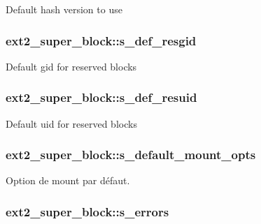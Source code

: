 Default hash version to use \hypertarget{structext2__super__block_a2973f6cda59f008e1f649c6d68ddafd6}{
\subsubsection[{s\-\_\-def\-\_\-resgid}]{ ext2\-\_\-super\-\_\-block\-::s\-\_\-def\-\_\-resgid}}\label{structext2__super__block_a2973f6cda59f008e1f649c6d68ddafd6}
Default gid for reserved blocks \hypertarget{structext2__super__block_a83da108c4a1f27a275f54970fb8edf07}{
\subsubsection[{s\-\_\-def\-\_\-resuid}]{ ext2\-\_\-super\-\_\-block\-::s\-\_\-def\-\_\-resuid}}\label{structext2__super__block_a83da108c4a1f27a275f54970fb8edf07}
Default uid for reserved blocks \hypertarget{structext2__super__block_a8f4946dffa8c6a9027ee9329fd3f94c9}{
\subsubsection[{s\-\_\-default\-\_\-mount\-\_\-opts}]{ ext2\-\_\-super\-\_\-block\-::s\-\_\-default\-\_\-mount\-\_\-opts}}\label{structext2__super__block_a8f4946dffa8c6a9027ee9329fd3f94c9}
Option de mount par défaut. \hypertarget{structext2__super__block_a06e31d621f6250d56d1af5c342220a08}{
\subsubsection[{s\-\_\-errors}]{ ext2\-\_\-super\-\_\-block\-::s\-\_\-errors}}\label{structext2__super__block_a06e31d621f6250d56d1af5c342220a08}

